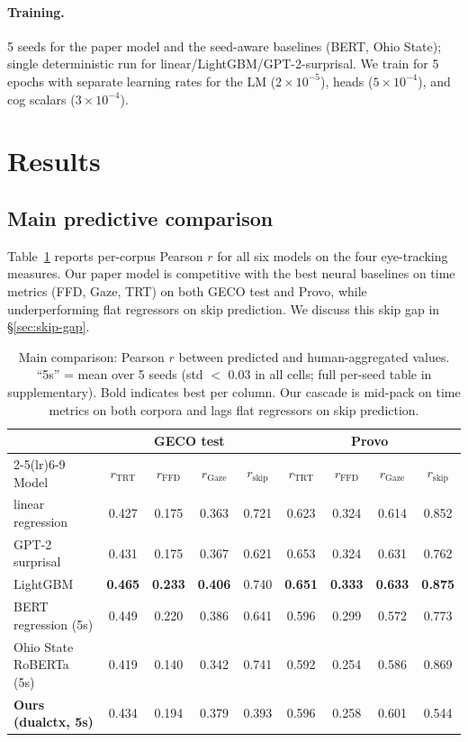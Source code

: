 \documentclass[11pt]{article}
\begin{document}
\paragraph{Training.} 5 seeds for the paper model and the seed-aware baselines (BERT, Ohio State); single deterministic run for linear/LightGBM/GPT-2-surprisal. We train for 5 epochs with separate learning rates for the LM ($2\times 10^{-5}$), heads ($5\times 10^{-4}$), and cog scalars ($3\times 10^{-4}$).

\section{Results}\label{sec:results}

\subsection{Main predictive comparison}\label{sec:main}

Table~\ref{tab:main} reports per-corpus Pearson $r$ for all six models on the four eye-tracking measures. Our paper model is competitive with the best neural baselines on time metrics (FFD, Gaze, TRT) on both GECO test and Provo, while underperforming flat regressors on skip prediction. We discuss this skip gap in \S\ref{sec:skip-gap}.

\begin{table}[h]
\centering
\small
\setlength{\tabcolsep}{4pt}
\begin{tabular}{l*{4}{c}@{\hskip 6pt}*{4}{c}}
\toprule
& \multicolumn{4}{c}{\textbf{GECO test}} & \multicolumn{4}{c}{\textbf{Provo}} \\
\cmidrule(lr){2-5}\cmidrule(lr){6-9}
Model & $r_{\text{TRT}}$ & $r_{\text{FFD}}$ & $r_{\text{Gaze}}$ & $r_{\text{skip}}$ & $r_{\text{TRT}}$ & $r_{\text{FFD}}$ & $r_{\text{Gaze}}$ & $r_{\text{skip}}$ \\
\midrule
linear regression       & 0.427 & 0.175 & 0.363 & 0.721 & 0.623 & 0.324 & 0.614 & 0.852 \\
GPT-2 surprisal         & 0.431 & 0.175 & 0.367 & 0.621 & 0.653 & 0.324 & 0.631 & 0.762 \\
LightGBM                & \textbf{0.465} & \textbf{0.233} & \textbf{0.406} & 0.740 & \textbf{0.651} & \textbf{0.333} & \textbf{0.633} & \textbf{0.875} \\
BERT regression (5s)    & 0.449 & 0.220 & 0.386 & 0.641 & 0.596 & 0.299 & 0.572 & 0.773 \\
Ohio State RoBERTa (5s) & 0.419 & 0.140 & 0.342 & 0.741 & 0.592 & 0.254 & 0.586 & 0.869 \\
\midrule
\textbf{Ours (dualctx, 5s)} & 0.434 & 0.194 & 0.379 & 0.393 & 0.596 & 0.258 & 0.601 & 0.544 \\
\bottomrule
\end{tabular}
\caption{Main comparison: Pearson $r$ between predicted and human-aggregated values. ``5s'' = mean over 5 seeds (std $<$ 0.03 in all cells; full per-seed table in supplementary). Bold indicates best per column. Our cascade is mid-pack on time metrics on both corpora and lags flat regressors on skip prediction.}
\label{tab:main}
\end{table}
\end{document}
